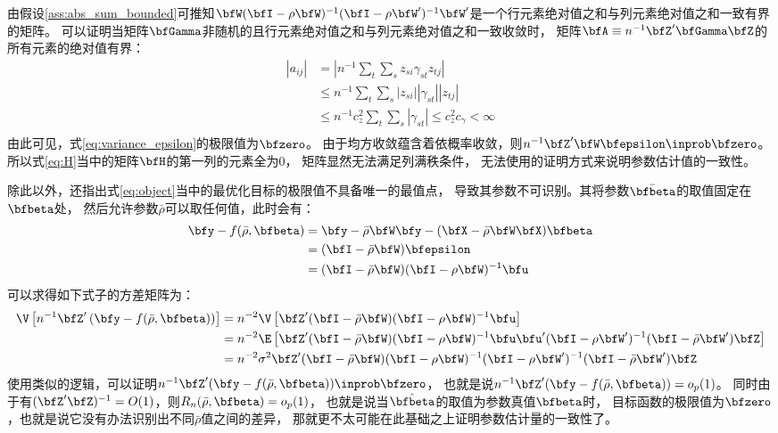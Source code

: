 \documentclass[black,normal,authoryear]{elegantnote}
\newcommand{\cqref}[1]{式\eqref{#1}}
\begin{document}
    由假设\ref{ass:abs_sum_bounded}可推知$\bfW(\bfI-\rho\bfW)^{-1}(\bfI-\rho\bfW')^{-1}\bfW'$是一个行元素绝对值之和与列元素绝对值之和一致有界的矩阵。
    可以证明当矩阵$\bfGamma$非随机的且行元素绝对值之和与列元素绝对值之和一致收敛时，
    矩阵$\bfA\equiv n^{-1}\bfZ'\bfGamma\bfZ$的所有元素的绝对值有界：
    \begin{equation}
        \begin{split}
            |a_{ij}|
            &=\left|n^{-1}\sum_t\sum_sz_{si}\gamma_{st}z_{tj}\right|\\
            &\le n^{-1}\sum_t\sum_s|z_{si}||\gamma_{st}||z_{tj}|\\
            &\le n^{-1}c^2_z\sum_t\sum_s|\gamma_{st}|\le c^2_zc_\gamma<\infty\\
        \end{split}
    \end{equation}
    由此可见，\cqref{eq:variance_epsilon}的极限值为$\bfzero$。
    由于均方收敛蕴含着依概率收敛，则$n^{-1}\bfZ'\bfW\bfepsilon\inprob\bfzero$。
    所以\cqref{eq:H}当中的矩阵$\bfH$的第一列的元素全为$0$，
    矩阵显然无法满足列满秩条件，
    无法使用\cite{amemiya1985}的证明方式来说明参数估计值的一致性。

    除此以外，\cite{kelejian1997}还指出\cqref{eq:object}当中的最优化目标的极限值不具备唯一的最值点，
    导致其参数不可识别。其将参数$\bar{\bfbeta}$的取值固定在$\bfbeta$处，
    然后允许参数$\bar{\rho}$可以取任何值，此时会有：
    \begin{equation}
        \begin{split}
            \bfy-f(\bar{\rho},\bfbeta)
            &=\bfy-\bar{\rho}\bfW\bfy-(\bfX-\bar{\rho}\bfW\bfX)\bfbeta\\
            &=(\bfI-\bar{\rho}\bfW)\bfepsilon\\
            &=(\bfI-\bar{\rho}\bfW)(\bfI-\rho\bfW)^{-1}\bfu\\
        \end{split}
    \end{equation}
    可以求得如下式子的方差矩阵为：
    \begin{equation}
        \begin{split}
            \V\left[n^{-1}\bfZ'\left(\bfy-f(\bar{\rho},\bfbeta)\right)\right]
            &=n^{-2}\V\left[\bfZ'(\bfI-\bar{\rho}\bfW)(\bfI-\rho\bfW)^{-1}\bfu\right]\\
            &=n^{-2}\E\left[\bfZ'(\bfI-\bar{\rho}\bfW)(\bfI-\rho\bfW)^{-1}\bfu\bfu'(\bfI-\rho\bfW')^{-1}(\bfI-\bar{\rho}\bfW')\bfZ\right]\\
            &=n^{-2}\sigma^2\bfZ'(\bfI-\bar{\rho}\bfW)(\bfI-\rho\bfW)^{-1}(\bfI-\rho\bfW')^{-1}(\bfI-\bar{\rho}\bfW')\bfZ\\
        \end{split}
    \end{equation}
    使用类似的逻辑，可以证明$n^{-1}\bfZ'(\bfy-f(\bar{\rho},\bfbeta))\inprob\bfzero$，
    也就是说$n^{-1}\bfZ'(\bfy-f(\bar{\rho},\bfbeta))=o_p(1)$。
    同时由于有$(\bfZ'\bfZ)^{-1}=O(1)$，则$R_n(\bar{\rho},\bfbeta)=o_p(1)$，
    也就是说当$\hat{\bfbeta}$的取值为参数真值$\bfbeta$时，
    目标函数的极限值为$\bfzero$，也就是说它没有办法识别出不同$\bar{\rho}$值之间的差异，
    那就更不太可能在此基础之上证明参数估计量的一致性了。
\end{document}
